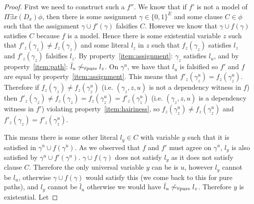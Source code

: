 \documentclass[runningheads]{llncs}
\newcommand{\pusim}{\ensuremath{\sim_{\mbox{\scriptsize \upshape $\forall$pure}}}}
\begin{document}
\begin{proof}
		First we need to construct such a $f''$. We know that if $f'$ is not a model of $\Pi\exists x(D_x) \phi$, then there is some assignment $\gamma\in \{0,1\}^{E}$ and some clause $C\in \phi$ such that the assignment $\gamma \cup f'(\gamma)$ falsifies $C$. 
		However we know that $\gamma \cup f(\gamma)$ satisfies $C$ because $f$ is a model. Hence there is some existential variable $z$ such that $f'_z(\gamma_z)\neq f_z(\gamma_z)$ and some literal $l_z$ in $z$ such that $f_z(\gamma_z)$ satisfies $l_z$ and $f'_z(\gamma_z)$ falsifies $l_z$. By property~\ref{item:assignment}: $ \gamma_z$ satisfies $l_u$, and by property~\ref{item:path}: $\bar l_u \not \pusim l_z$.
		On $\gamma^u$, we have that $l_u$ is falsified so $f'$ and $f$ are equal by property~\ref{item:assignment}.  This means that $f'_z(\gamma^u_z)=f_z(\gamma^u_z)$. Therefore if $f_z(\gamma_z)\neq f_z(\gamma^u_z)$ (i.e. $(\gamma_z, z, u)$ is not a dependency witness in $f$) then 
		$f'_z(\gamma_z)\neq f_z(\gamma_z)=f_z(\gamma^u_z)=f'_z(\gamma^u_z)$ (i.e. $(\gamma_z, z, u)$ is a dependency witness in $f'$) violating property~\ref{item:hairiness}, so $f_z(\gamma^u_z)\neq f_z(\gamma^u_z)$ and $f'_z(\gamma_z)=f'_z(\gamma^u_z)$.
		
		This means there is some other literal  $l_y\in C$ with variable $y$ such that it is satisfied in $\gamma^u \cup f(\gamma^u)$. As we observed that $f$ and $f'$ must agree on $\gamma^u$, $l_y$ is also satisfied by $\gamma^u \cup f'(\gamma^u)$.
	 	$\gamma \cup f(\gamma)$ does not satisfy $l_y$ as it does not satisfy clause $C$. Therefore the only universal variable $y$ can be is $u$, however $l_y$ cannot be $l_u$, otherwise $\gamma \cup f(\gamma)$ would satisfy this (we come back to this for pure paths), and  $l_y$ cannot be $\bar l_u$ otherwise we would have $\bar l_u \not \pusim l_z$.
	 	Therefore $y$ is existential. Let
	 	

\end{proof}
\end{document}
